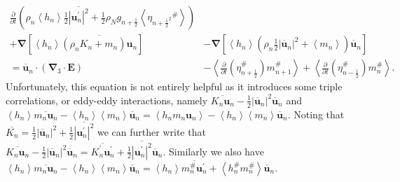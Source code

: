 \documentclass[12pt,a4paper]{report}
\newcommand*\thkmean[1]{\overline{#1}}
\newcommand*\thkres[1]{{#1}^{\prime}}
\newcommand*\nthkmean[1]{\left\langle{#1}\right\rangle}
\newcommand*\nthkres[1]{{#1}^{\#}}
\newcommand*{\half}{\frac{1}{2}}
\begin{document}
        \begin{equation}
        \begin{split}
            \frac{\partial}{\partial t}\left(\rho_{n} \nthkmean{h_{n}} \half\thkmean{ \left|\thkres{\boldsymbol{u}}_{n}\right|^{2}}+ 
            \half \rho_{N} g_{n+\half }\nthkmean{\nthkres{\eta_{n+\half ^{2}}}} \right)
            &\\
            +\boldsymbol{\nabla} \left[\nthkmean{h_{n}} \thkmean{\left(\rho_{n}K_{n}+m_{n}\right) \boldsymbol{u}_{n}}\right] &-\boldsymbol{\nabla} \left[\nthkmean{h_{n}} \left(\rho_{n}\half \left|\thkmean{\boldsymbol{u}}_{n}\right|^{2}+\nthkmean{m_{n}}\right) \thkmean{\boldsymbol{u}}_{n}\right]\\
            =\thkmean{\boldsymbol{u}}_{n} \cdot \left(\boldsymbol{\nabla}_{3}\cdot \boldsymbol{E}\right)
            &- \nthkmean{\frac{\partial}{\partial t}\left(\nthkres{\eta}_{n+\half }\right)   \nthkres{m}_{n+1}}
            + \nthkmean{\frac{\partial}{\partial t}\left(\nthkres{\eta}_{n-\half }\right) \nthkres{m}_{n}}.
          \end{split}
          \label{eddyenergy}
        \end{equation}
        Unfortunately, this equation is not entirely helpful as it
        introduces some triple correlations, or eddy-eddy interactions,
        namely $\thkmean{K_{n} \boldsymbol{u}_{n}}
        -\half \left|\thkmean{\boldsymbol{u}}_{n}\right|^{2}
        \thkmean{\boldsymbol{u}}_{n}$ and 
        $\nthkmean{h_{n}}\thkmean{m_{n}\boldsymbol{u}_{n}}
        -\nthkmean{h_{n}} \nthkmean{m_{n}}\thkmean{\boldsymbol{u}}_{n}
         = \nthkmean{h_{n}m_{n}\boldsymbol{u}_{n}}
        -\nthkmean{h_{n}}\nthkmean{m_{n}}\thkmean{\boldsymbol{u}}_{n}$.
        Noting that $\thkmean{K_{n}} = \half \left|\thkmean{\boldsymbol{u}}_{n}\right|^{2} +
        \half \thkmean{\left|\thkres{\boldsymbol{u}}_{n}\right|^{2}}$
        we can further write that 
        $\thkmean{K_{n} \boldsymbol{u}_{n}}
        -\half \left|\thkmean{\boldsymbol{u}}_{n}\right|^{2}
        \thkmean{\boldsymbol{u}}_{n} = \thkmean{\thkres{K}_{n} \thkres{\boldsymbol{u}}_{n}}
                +\half \thkmean{\left|\thkres{\boldsymbol{u}}_{n}\right|^{2}}
                \thkmean{\boldsymbol{u}}_{n}$. Similarly we
                also have 
                $\nthkmean{h_{n}}\thkmean{m_{n}\boldsymbol{u}_{n}}
                -\nthkmean{h_{n}} \nthkmean{m_{n}}\thkmean{\boldsymbol{u}}_{n}
                = 
                \nthkmean{h_{n}}\thkmean{\nthkres{m}_{n}\thkres{\boldsymbol{u}}_{n}}
                +\nthkmean{\nthkres{h}_{n} \nthkres{m}_{n}}\thkmean{\boldsymbol{u}}_{n}$.
\end{document}

